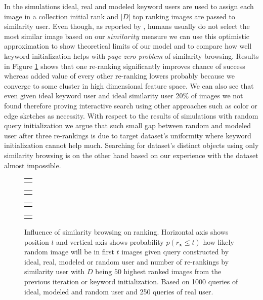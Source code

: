 In the simulations ideal, real and modeled keyword users are used to assign each image in a collection initial rank and $|D|$ top ranking images are passed to similarity user. Even though, as reported by \cite{kovalvcik2017comparison}, humans usually do not select the most similar image based on our $similarity$ measure we can use this optimistic approximation to show theoretical limits of our model and to compare how well keyword initialization helps with \textit{page zero problem} of similarity browsing.
Results in Figure \ref{fig:simulation_rerank} shows that one re-ranking significantly improves chance of success whereas added value of every other re-ranking lowers probably because we converge to some cluster in high dimensional feature space. We can also see that even given ideal keyword user and ideal similarity user 20\% of images we not found therefore proving interactive search using other approaches such as color or edge sketches as necessity. With respect to the results of simulations with random query initialization we argue that such small gap between random and modeled user after three re-rankings is due to target dataset's uniformity where keyword initialization cannot help much. Searching for dataset's distinct objects using only similarity browsing is on the other hand based on our experience with the dataset almost impossible.

\begin{figure}
	\centering
	\begin{tabular}{@{}c@{}}
		\subfloat{
			
		}
	\end{tabular}
	\begin{tabular}{@{}c@{}}
		\subfloat{
			
		}
	\end{tabular}
	\begin{tabular}{@{}c@{}}
		\subfloat{
			
		}
	\end{tabular}
	\begin{tabular}{@{}c@{}}
		\subfloat{
			
		}
	\end{tabular}


	\caption[Influence of similarity browsing on ranking]{Influence of similarity browsing on ranking. Horizontal axis shows position $t$ and vertical axis shows probability $p(r_{\bm{x}}\leq t)$ how likely random image will be in first $t$ images given query constructed by ideal, real, modeled or random user and number of re-rankings by similarity user with $D$ being $50$ highest ranked images from the previous iteration or keyword initialization. Based on 1000 queries of ideal, modeled and random user and 250 queries of real user.}
	\label{fig:simulation_rerank}
\end{figure}

